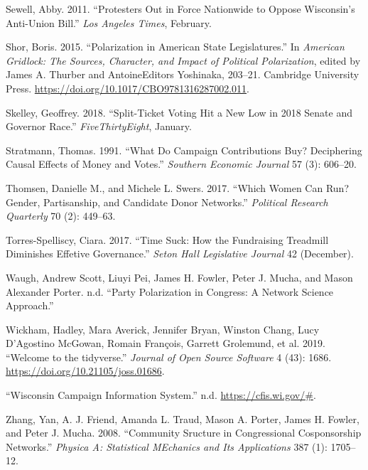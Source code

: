 \documentclass[12pt,]{article}
\begin{document}
\leavevmode\hypertarget{ref-sewell2011}{}%
Sewell, Abby. 2011. ``Protesters Out in Force Nationwide to Oppose
Wisconsin's Anti-Union Bill.'' \emph{Los Angeles Times}, February.

\leavevmode\hypertarget{ref-shor2015}{}%
Shor, Boris. 2015. ``Polarization in American State Legislatures.'' In
\emph{American Gridlock: The Sources, Character, and Impact of Political
Polarization}, edited by James A. Thurber and AntoineEditors Yoshinaka,
203--21. Cambridge University Press.
\url{https://doi.org/10.1017/CBO9781316287002.011}.

\leavevmode\hypertarget{ref-skelley2018}{}%
Skelley, Geoffrey. 2018. ``Split-Ticket Voting Hit a New Low in 2018
Senate and Governor Race.'' \emph{FiveThirtyEight}, January.

\leavevmode\hypertarget{ref-stratmann1991}{}%
Stratmann, Thomas. 1991. ``What Do Campaign Contributions Buy?
Deciphering Causal Effects of Money and Votes.'' \emph{Southern Economic
Journal} 57 (3): 606--20.

\leavevmode\hypertarget{ref-thomsen2017}{}%
Thomsen, Danielle M., and Michele L. Swers. 2017. ``Which Women Can Run?
Gender, Partisanship, and Candidate Donor Networks.'' \emph{Political
Research Quarterly} 70 (2): 449--63.

\leavevmode\hypertarget{ref-torres-spelliscy2017}{}%
Torres-Spelliscy, Ciara. 2017. ``Time Suck: How the Fundraising
Treadmill Diminishes Effetive Governance.'' \emph{Seton Hall Legislative
Journal} 42 (December).

\leavevmode\hypertarget{ref-waugh2009}{}%
Waugh, Andrew Scott, Liuyi Pei, James H. Fowler, Peter J. Mucha, and
Mason Alexander Porter. n.d. ``Party Polarization in Congress: A Network
Science Approach.''

\leavevmode\hypertarget{ref-tidyverse}{}%
Wickham, Hadley, Mara Averick, Jennifer Bryan, Winston Chang, Lucy
D'Agostino McGowan, Romain François, Garrett Grolemund, et al. 2019.
``Welcome to the tidyverse.'' \emph{Journal of Open Source Software} 4
(43): 1686. \url{https://doi.org/10.21105/joss.01686}.

\leavevmode\hypertarget{ref-cfis}{}%
``Wisconsin Campaign Information System.'' n.d.
\url{https://cfis.wi.gov/\#}.

\leavevmode\hypertarget{ref-zhang2008}{}%
Zhang, Yan, A. J. Friend, Amanda L. Traud, Mason A. Porter, James H.
Fowler, and Peter J. Mucha. 2008. ``Community Sructure in Congressional
Cosponsorship Networks.'' \emph{Physica A: Statistical MEchanics and Its
Applications} 387 (1): 1705--12.





\newpage
\singlespacing 
\end{document}
